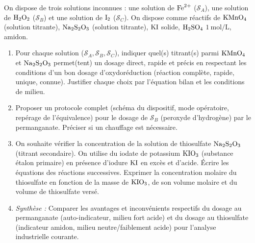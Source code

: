 \documentclass[11pt]{article}
\begin{document}
\begin{exercice}
On dispose de trois solutions inconnues : une solution de $\ce{Fe^{2+}}$ ($\mathcal{S}_A$), une solution de $\ce{H2O2}$ ($\mathcal{S}_B$) et une solution de $\ce{I2}$ ($\mathcal{S}_C$). On dispose comme réactifs de $\ce{KMnO4}$ (solution titrante), $\ce{Na2S2O3}$ (solution titrante), $\ce{KI}$ solide, $\ce{H2SO4}$ $\SI{1}{\mol\per\L}$, amidon.
\begin{enumerate}
    \item Pour chaque solution ($\mathcal{S}_A, \mathcal{S}_B, \mathcal{S}_C$), indiquer quel(s) titrant(s) parmi $\ce{KMnO4}$ et $\ce{Na2S2O3}$ permet(tent) un dosage direct, rapide et précis en respectant les conditions d'un bon dosage d'oxydoréduction (réaction complète, rapide, unique, connue). Justifier chaque choix par l'équation bilan et les conditions de milieu.
    \item Proposer un protocole complet (schéma du dispositif, mode opératoire, repérage de l'équivalence) pour le dosage de $\mathcal{S}_B$ (peroxyde d'hydrogène) par le permanganate. Préciser si un chauffage est nécessaire.
    \item On souhaite vérifier la concentration de la solution de thiosulfate $\ce{Na2S2O3}$ (titrant secondaire). On utilise du iodate de potassium $\ce{KIO3}$ (substance étalon primaire) en présence d'iodure $\ce{KI}$ en excès et d'acide. Écrire les équations des réactions successives. Exprimer la concentration molaire du thiosulfate en fonction de la masse de $\ce{KIO3}$, de son volume molaire et du volume de thiosulfate versé.
    \item \textit{Synthèse :} Comparer les avantages et inconvénients respectifs du dosage au permanganate (auto-indicateur, milieu fort acide) et du dosage au thiosulfate (indicateur amidon, milieu neutre/faiblement acide) pour l'analyse industrielle courante.
\end{enumerate}
\end{exercice}
\end{document}
